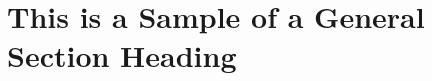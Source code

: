 \documentclass[letterpaper, preprint, paper,11pt]{AAS}	%
\begin{document}




\section{This is a Sample of a General Section Heading}
\end{document}
